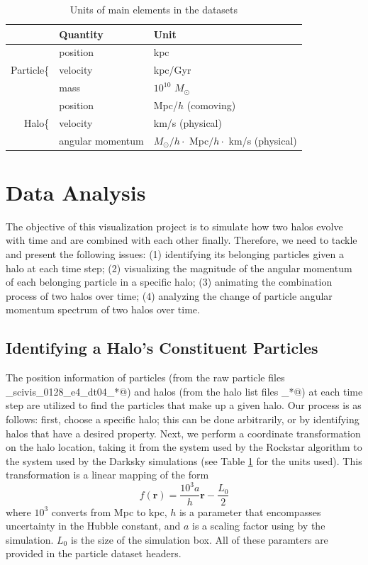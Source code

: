 \documentclass[12pt]{article}
\newcommand{\Msun}{\ensuremath{M_\odot}}
\renewcommand{\vec}[1]{\mathbf{#1}}
\begin{document}
\begin{table}[h]
\centering
\begin{tabular}{rll}
                          &  \textbf{Quantity} & \textbf{Unit} \\
\hline
\multirow{3}{*}{Particle\Huge\{} &  position          & kpc             \\
                                 &  velocity          & kpc/Gyr         \\
                                 &  mass              & $10^{10}$ \Msun \\
\hline
\multirow{3}{*}{Halo\Huge\{}     &  position          & Mpc/$h$ (comoving) \\
                                 &  velocity          & km/s (physical)  \\
                                 &  angular momentum  & $\Msun/h \cdot$ Mpc$/h \cdot$ km/s (physical)  \\
\end{tabular}
\caption {Units of main elements in the datasets}
\label{tab:units}
\end{table}


\section{Data Analysis}
The objective of this visualization project is to simulate how two halos evolve with 
time and are combined with each other finally. Therefore, we need to tackle and present
the following issues: (1) identifying its belonging particles given a halo at each time 
step; (2) visualizing the magnitude of the angular momentum of each belonging particle 
in a specific halo; (3) animating the combination process of two halos over time;
(4) analyzing the change of particle angular momentum spectrum of two halos over time.

\subsection{Identifying a Halo's Constituent Particles}
The position information of particles (from the raw particle files
_scivis_0128_e4_dt04_*@) and halos (from the halo list files
\verb@hlist_*@) at each time step are utilized to find the particles that make
up a given halo. Our process is as follows: first, choose a specific halo; this
can be done arbitrarily, or by identifying halos that have a desired property.
Next, we perform a coordinate transformation on the halo location, taking it
from the system used by the Rockstar algorithm to the system used by the
Darksky simulations (see Table \ref{tab:units} for the units used). This
transformation is a linear mapping of the form
\begin{equation}
f(\vec{r}) = \frac{10^3 a}{h} \vec{r} - \frac{L_0}{2}
\end{equation}
where $10^{3}$ converts from Mpc to kpc, $h$ is a parameter that encompasses
uncertainty in the Hubble constant, and $a$ is a scaling factor using by the
simulation. $L_0$ is the size of the simulation box. All of these paramters are
provided in the particle dataset headers.
\end{document}
